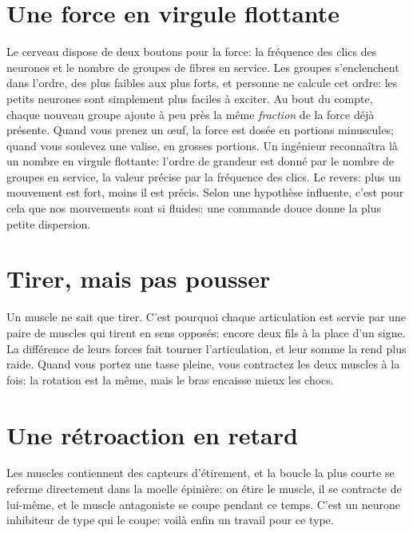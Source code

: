 \section*{Une force en virgule flottante}

Le cerveau dispose de deux boutons pour la force: la fréquence des clics des neurones et le nombre de groupes de fibres en service. Les groupes s'enclenchent dans l'ordre, des plus faibles aux plus forts, et personne ne calcule cet ordre: les petits neurones sont simplement plus faciles à exciter. Au bout du compte, chaque nouveau groupe ajoute à peu près la même \emph{fraction} de la force déjà présente. Quand vous prenez un œuf, la force est dosée en portions minuscules; quand vous soulevez une valise, en grosses portions. Un ingénieur reconnaîtra là un nombre en virgule flottante: l'ordre de grandeur est donné par le nombre de groupes en service, la valeur précise par la fréquence des clics. Le revers: plus un mouvement est fort, moins il est précis. Selon une hypothèse influente, c'est pour cela que nos mouvements sont si fluides: une commande douce donne la plus petite dispersion.

\section*{Tirer, mais pas pousser}

Un muscle ne sait que tirer. C'est pourquoi chaque articulation est servie par une paire de muscles qui tirent en sens opposés: encore deux fils à la place d'un signe. La différence de leurs forces fait tourner l'articulation, et leur somme la rend plus raide. Quand vous portez une tasse pleine, vous contractez les deux muscles à la fois: la rotation est la même, mais le bras encaisse mieux les chocs.


\section*{Une rétroaction en retard}

Les muscles contiennent des capteurs d'étirement, et la boucle la plus courte se referme directement dans la moelle épinière: on étire le muscle, il se contracte de lui-même, et le muscle antagoniste se coupe pendant ce temps. C'est un neurone inhibiteur de type  qui le coupe: voilà enfin un travail pour ce type.

